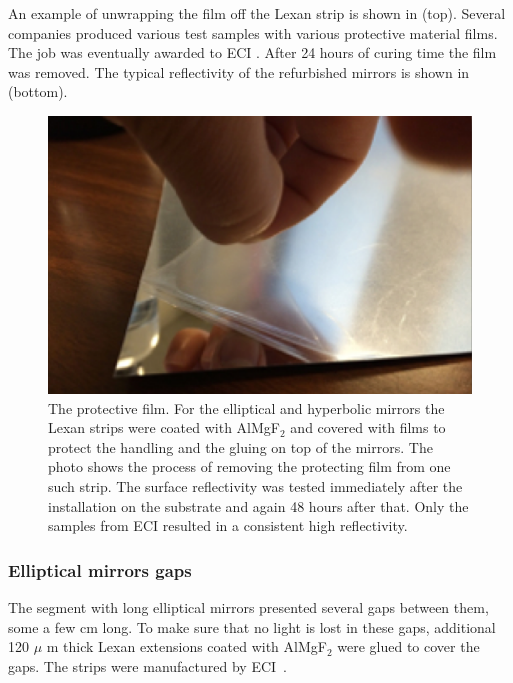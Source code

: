 An example of unwrapping the film off the Lexan strip is shown in  (top). Several companies produced various test samples with
various protective material films. The job was eventually awarded to ECI \cite{ECI}.
After 24 hours of curing time the film was removed.
The typical reflectivity of the refurbished mirrors is shown in  (bottom).


\begin{figure}
\centering
	\includegraphics[width=0.98\columnwidth, height=0.7\columnwidth]{img/filmOnStrip.png}
	\caption{The protective film. For the elliptical and hyperbolic mirrors the Lexan strips were coated with AlMgF$_2$
				and covered with films to protect the handling and the
				gluing on top of the mirrors. The photo shows the process of removing the
            protecting film from one such strip. The surface reflectivity was tested immediately after the installation on the substrate and again
            48 hours after that. Only the samples from ECI \cite{ECI} resulted in a consistent high reflectivity. }
	\label{fig:filmOnStrip}
\end{figure}


\subsubsection{Elliptical mirrors gaps}

The segment with long elliptical mirrors presented several gaps between them, some a few cm long. To make sure that no light is lost in these gaps,
additional 120 $\mu$ m thick Lexan extensions coated with AlMgF$_2$ were glued to cover the gaps. The strips were manufactured by ECI~\cite{ECI}.



